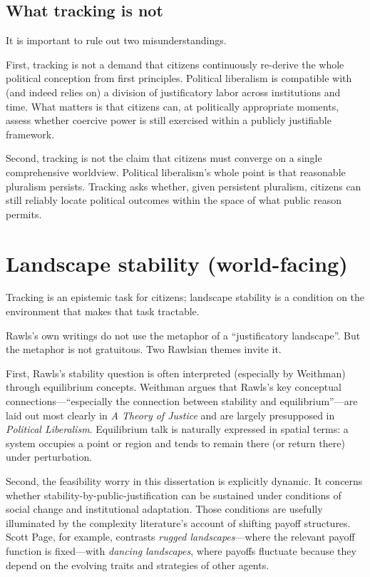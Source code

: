 \documentclass[12pt]{report}
\begin{document}
\subsection{What tracking is not}

It is important to rule out two misunderstandings.

First, tracking is not a demand that citizens continuously re-derive the whole political conception from first principles. Political liberalism is compatible with (and indeed relies on) a division of justificatory labor across institutions and time. What matters is that citizens can, at politically appropriate moments, assess whether coercive power is still exercised within a publicly justifiable framework.\parencite[p.~767]{rawls1997public}

Second, tracking is not the claim that citizens must converge on a single comprehensive worldview. Political liberalism’s whole point is that reasonable pluralism persists.\parencite[p.~765]{rawls1997public} Tracking asks whether, given persistent pluralism, citizens can still reliably locate political outcomes within the space of what public reason permits.

\section{Landscape stability (world-facing)}\label{sec:landscape}

Tracking is an epistemic task for citizens; landscape stability is a condition on the environment that makes that task tractable.

Rawls’s own writings do not use the metaphor of a \enquote{justificatory landscape}. But the metaphor is not gratuitous. Two Rawlsian themes invite it.

First, Rawls’s stability question is often interpreted (especially by Weithman) through equilibrium concepts. Weithman argues that Rawls’s key conceptual connections---\enquote{especially the connection between stability and equilibrium}---are laid out most clearly in \emph{A Theory of Justice} and are largely presupposed in \emph{Political Liberalism}.\parencite[p.~1188]{Weithman2024Rescuing} Equilibrium talk is naturally expressed in spatial terms: a system occupies a point or region and tends to remain there (or return there) under perturbation.

Second, the feasibility worry in this dissertation is explicitly dynamic. It concerns whether stability-by-public-justification can be sustained under conditions of social change and institutional adaptation. Those conditions are usefully illuminated by the complexity literature’s account of shifting payoff structures. Scott Page, for example, contrasts \emph{rugged landscapes}---where the relevant payoff function is fixed---with \emph{dancing landscapes}, where payoffs fluctuate because they depend on the evolving traits and strategies of other agents.\parencite[p.~94]{page2011diversity}
\end{document}

